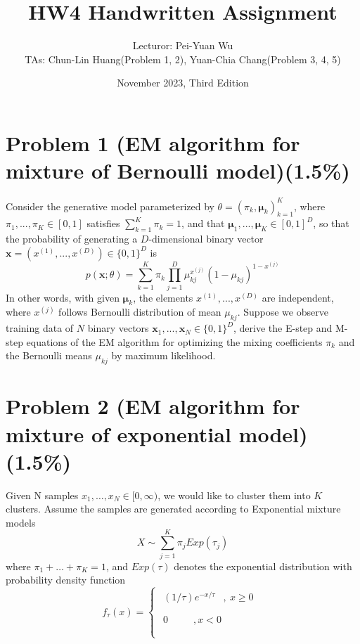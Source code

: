 \documentclass{article}
\title{HW4 Handwritten Assignment}
\author{Lecturor: Pei-Yuan Wu\\
TAs: {Chun-Lin Huang(Problem 1, 2), Yuan-Chia Chang(Problem 3, 4, 5)}}
\date{November 2023, Third Edition}
\def\vecx{{\mathbf x}}
\def\vecmu{{\boldsymbol \mu}}
\begin{document}
\maketitle

\section*{Problem 1 (EM algorithm for mixture of Bernoulli model)(1.5\%)}
Consider the generative model parameterized by $\theta = (\pi_k,\vecmu_k)_{k=1}^K$, where $\pi_1,...,\pi_K \in [0,1]$ satisfies $\sum_{k=1}^K\pi_k = 1$, and that $\vecmu_1,...,\vecmu_K  \in [0,1]^D$, so that the probability of generating a $D$-dimensional binary vector $\vecx = (x^{(1)},...,x^{(D)}) \in \{0,1\}^D$ is
\begin{equation*}
p(\vecx; \theta) = \sum_{k=1}^K \pi_k \prod_{j=1}^D \mu_{kj}^{x^{(j)}}(1-\mu_{kj})^{1-x^{(j)}}
\end{equation*}
%
In other words, with given $\vecmu_k$, the elements $x^{(1)},...,x^{(D)}$ are independent, where $x^{(j)}$ follows Bernoulli distribution of mean $\mu_{kj}$.  Suppose we observe training data of $N$ binary vectors $\vecx_1,...,\vecx_N \in \{0,1\}^D$, derive the E-step and M-step equations of the EM algorithm for optimizing the mixing coefficients $\pi_k$ and the Bernoulli means $\mu_{kj}$ by maximum likelihood.

\section*{Problem 2 (EM algorithm for mixture of exponential model)(1.5\%)}
Given N samples \(x_{1},\ldots,x_{N} \in \lbrack 0,\infty)\), we would
like to cluster them into \(K\) clusters. Assume the samples are
generated according to Exponential mixture models
\[X\sim\sum_{j = 1}^{K}{\pi_{j}Exp(\tau_{j})}\]
where \(\pi_{1} + \ldots + \pi_{K} = 1\), and \(Exp(\tau)\) denotes the
exponential distribution with probability density function
\[f_{\tau}(x) = \left\{ \begin{matrix}
\begin{matrix}
(1/\tau)e^{- x/\tau} & ,\ x \geq 0 \\
\end{matrix} \\
\begin{matrix}
0\ \ \ \ \ \ \ \  & ,x < 0 \\
\end{matrix} \\
\end{matrix} \right.\ \]
\end{document}

